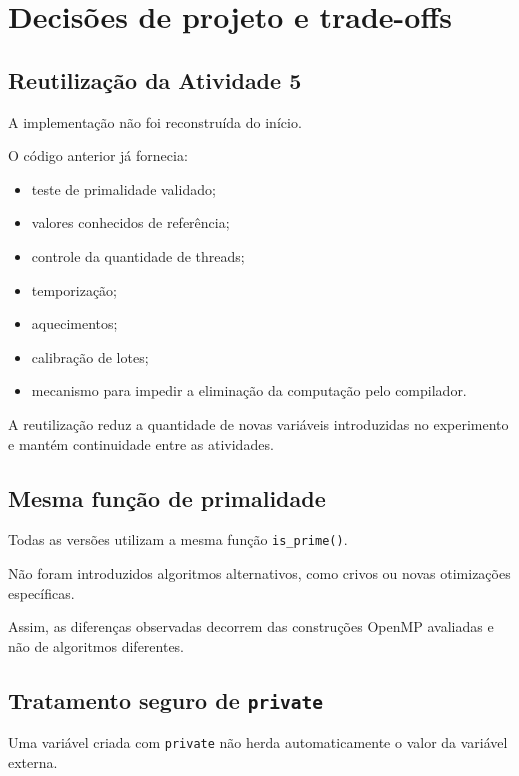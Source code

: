 \section{Decisões de projeto e trade-offs}
\label{sec:atvd07-decisoes}

\subsection{Reutilização da Atividade 5}

A implementação não foi reconstruída do início.

O código anterior já fornecia:

\begin{itemize}
    \item teste de primalidade validado;
    \item valores conhecidos de referência;
    \item controle da quantidade de threads;
    \item temporização;
    \item aquecimentos;
    \item calibração de lotes;
    \item mecanismo para impedir a eliminação da computação pelo compilador.
\end{itemize}

A reutilização reduz a quantidade de novas variáveis introduzidas no
experimento e mantém continuidade entre as atividades.


\subsection{Mesma função de primalidade}

Todas as versões utilizam a mesma função \texttt{is\_prime()}.

Não foram introduzidos algoritmos alternativos, como crivos ou novas
otimizações específicas.

Assim, as diferenças observadas decorrem das construções OpenMP avaliadas e
não de algoritmos diferentes.


\subsection{Tratamento seguro de \texttt{private}}

Uma variável criada com \texttt{private} não herda automaticamente o valor
da variável externa.

